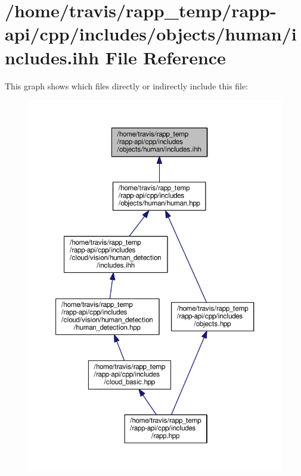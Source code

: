 \hypertarget{objects_2human_2includes_8ihh}{\section{/home/travis/rapp\-\_\-temp/rapp-\/api/cpp/includes/objects/human/includes.ihh File Reference}
\label{objects_2human_2includes_8ihh}
}
This graph shows which files directly or indirectly include this file\-:
\nopagebreak
\begin{figure}[H]
\begin{center}
\leavevmode
\includegraphics[width=350pt]{objects_2human_2includes_8ihh__dep__incl}
\end{center}
\end{figure}
